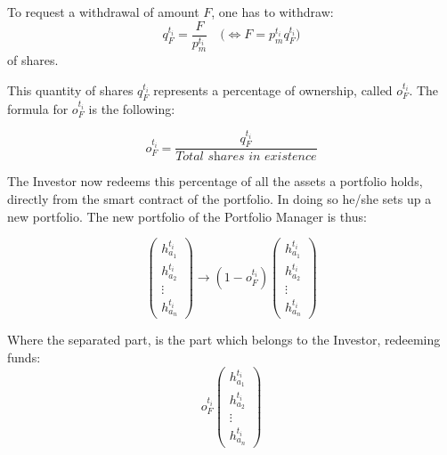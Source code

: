 \documentclass[9pt,oneside]{amsart}
\theoremstyle{plain}
\begin{document}
\begin{multicols}{2}
    To request a withdrawal of amount $F$, one has to withdraw:
    \begin{equation}
        q_{F}^{t_i} = \frac{F}{p_{m}^{t_i}} \quad \big( \Leftrightarrow F = p_{m}^{t_i}q_{F}^{t_i} \big)
    \end{equation}
    of shares.
    
    This quantity of shares $q_{F}^{t_i}$ represents a percentage of ownership, called $o_{F}^{t_i}$. The formula for $o_{F}^{t_i}$ is the following:
    
    \begin{equation}
        o_{F}^{t_i} = \frac{q_{F}^{t_i}}{\textit{Total shares in existence}}
    \end{equation}
    
    The Investor now redeems this percentage of all the assets a portfolio holds, directly from the smart contract of the portfolio. In doing so he/she sets up a new portfolio. The new portfolio of the Portfolio Manager is thus:
    
    \begin{equation*}
        \begin{pmatrix}
            h_{a_{1}}^{t_i}\\
            h_{a_{2}}^{t_i}\\
            \vdots \\
            h_{a_{n}}^{t_i}
        \end{pmatrix}
        \rightarrow
        (1 -
        o_{F}^{t_i})
        \begin{pmatrix}
            h_{a_{1}}^{t_i}\\
            h_{a_{2}}^{t_i}\\
            \vdots \\
            h_{a_{n}}^{t_i}
        \end{pmatrix}
    \end{equation*}
    
    Where the separated part, is the part which belongs to the Investor, redeeming funds:
    \begin{equation*}
        o_{F}^{t_i}
        \begin{pmatrix}
            h_{a_{1}}^{t_i}\\
            h_{a_{2}}^{t_i}\\
            \vdots \\
            h_{a_{n}}^{t_i}
        \end{pmatrix}
    \end{equation*}
    

\end{multicols}
\end{document}
